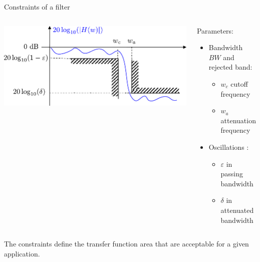   \begin{block}{Constraints of a filter}

\begin{columns}[T]
  \begin{column}%
       \begin{center}
 \begin{center}
  \includegraphics[width=.5\linewidth]{imgs/fourier/gabarit3}
\end{center}
\end{center}
  \end{column}%
  \begin{column}%
    \begin{block}{Parameters:}
      \begin{itemize}
      \item Bandwidth $BW$ and rejected band:
      \begin{itemize}
        \item $w_c$ cutoff frequency
        \item  $w_a$ attenuation frequency
      \end{itemize}
      \item Oscillations :
        \begin{itemize}
        \item $\varepsilon$ in passing bandwidth
        \item $\delta$ in attenuated bandwidth
        \end{itemize}
      \end{itemize}\vspace{7mm}
    \end{block}

  \end{column}
\end{columns}
 The constraints define the transfer function area that are acceptable for a given application.
  \end{block}

